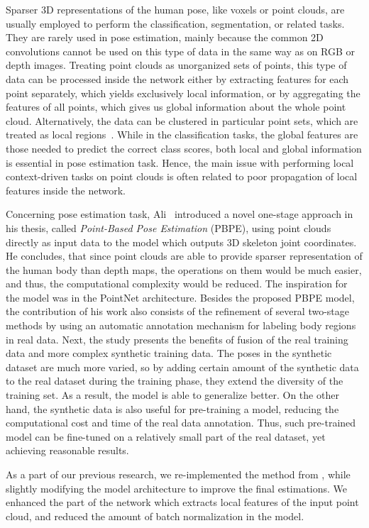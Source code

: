 \noindent
Sparser 3D representations of the human pose, like voxels or point clouds, are usually employed to perform the classification, segmentation, or related tasks. They are rarely used in pose estimation, mainly because the common 2D convolutions cannot be used on this type of data in the same way as on RGB or depth images. Treating point clouds as unorganized sets of points, this type of data can be processed inside the network either by extracting features for each point separately, which yields exclusively local information, or by aggregating the features of all points, which gives us global information about the whole point cloud. Alternatively, the data can be clustered in particular point sets, which are treated as local regions~\cite{DBLP:journals/corr/abs-1811-07246}. While in the classification tasks, the global features are those needed to predict the correct class scores, both local and global information is essential in pose estimation task. Hence, the main issue with performing local context-driven tasks on point clouds is often related to poor propagation of local features inside the network.\par
\vspace{5mm}
\noindent Concerning pose estimation task, Ali~\cite{Ali19} introduced a novel one-stage approach in his thesis, called \textit{Point-Based Pose Estimation} (PBPE), using point clouds directly as input data to the model which outputs 3D skeleton joint coordinates. He concludes, that since point clouds are able to provide sparser representation of the human body than depth maps, the operations on them would be much easier, and thus, the computational complexity would be reduced. The inspiration for the model was in the PointNet architecture. Besides the proposed PBPE model, the contribution of his work also consists of the refinement of several two-stage methods by using an automatic annotation mechanism for labeling body regions in real data. Next, the study presents the benefits of fusion of the real training data and more complex synthetic training data. The poses in the synthetic dataset are much more varied, so by adding certain amount of the synthetic data to the real dataset during the training phase, they extend the diversity of the training set. As a result, the model is able to generalize better. On the other hand, the synthetic data is also useful for pre-training a model, reducing the computational cost and time of the real data annotation. Thus, such pre-trained model can be fine-tuned on a relatively small part of the real dataset, yet achieving reasonable results. \par
\vspace{5mm}
\noindent As a part of our previous research, we re-implemented the method from \cite{Ali19}, while slightly modifying the model architecture to improve the final estimations. We enhanced the part of the network which extracts local features of the input point cloud, and reduced the amount of batch normalization in the model.\par

